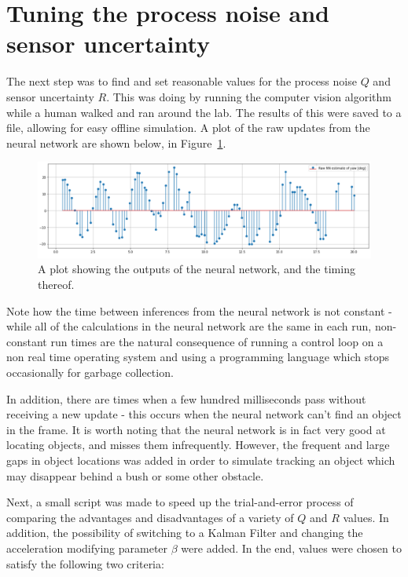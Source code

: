 \section{Tuning the process noise and sensor uncertainty}
The next step was to find and set reasonable values for the process noise $Q$ and sensor uncertainty $R$. This was doing by running the computer vision algorithm while a human walked and ran around the lab. The results of this were saved to a file, allowing for easy offline simulation. A plot of the raw updates from the neural network are shown below, in Figure~\ref{fig:raw_nn_results}.

\begin{figure}[h!]
  \centering
  \includegraphics[width=\textwidth]{methodology/raw_nn_results}
  \caption{\label{fig:raw_nn_results} A plot showing the outputs of the neural network, and the timing thereof.}
\end{figure}

Note how the time between inferences from the neural network is not constant - while all of the calculations in the neural network are the same in each run, non-constant run times are the natural consequence of running a control loop on a non real time operating system and using a programming language which stops occasionally for garbage collection.

In addition, there are times when a few hundred milliseconds pass without receiving a new update - this occurs when the neural network can't find an object in the frame. It is worth noting that the neural network is in fact very good at locating objects, and misses them infrequently. However, the frequent and large gaps in object locations was added in order to simulate tracking an object which may disappear behind a bush or some other obstacle.

Next, a small script was made to speed up the trial-and-error process of comparing the advantages and disadvantages of a variety of $Q$ and $R$ values. In addition, the possibility of switching to a Kalman Filter and changing the acceleration modifying parameter $\beta$ were added. In the end, values were chosen to satisfy the following two criteria:

